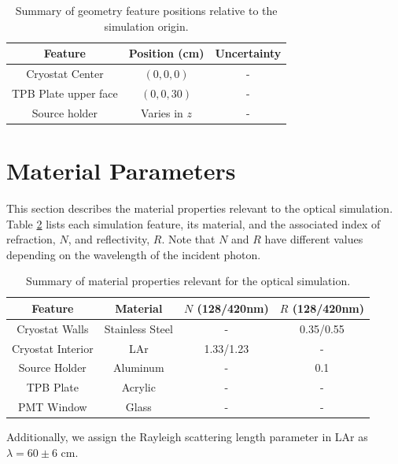 \documentclass[aps,pra,groupedaddress]{revtex4-1}
\begin{document}
\begin{table}
	\begin{center}
		\begin{tabular}{| c | c | c |}
			\hline
			Feature & Position (cm) & Uncertainty \\
			\hline
			Cryostat Center & $(0,0,0)$ & - \\
			TPB Plate upper face & $(0,0,30)$ & - \\
			Source holder & Varies in $z$ & - \\
			\hline
		\end{tabular}
		\caption{Summary of geometry feature positions relative to the simulation origin. \label{tab:pos}}
	\end{center}
\end{table}

\section{Material Parameters}

This section describes the material properties relevant to the optical simulation. Table \ref{tab:mats} lists each simulation feature, its material, and the associated index of refraction, $N$, and reflectivity, $R$. Note that $N$ and $R$ have different values depending on the wavelength of the incident photon.

\begin{table}
	\begin{center}
		\begin{tabular}{| c | c | c | c |}
			\hline
			Feature & Material & $N$ (128/420nm) & $R$ (128/420nm) \\
			\hline
			Cryostat Walls & Stainless Steel & - & 0.35/0.55 \\
			Cryostat Interior & LAr & 1.33/1.23 & -\\
			Source Holder & Aluminum & - & 0.1 \cite{johnson_1968}\\
			TPB Plate & Acrylic & - & - \\
			PMT Window & Glass & - & - \\
			\hline
		\end{tabular}
		\caption{Summary of material properties relevant for the optical simulation. \label{tab:mats}}
	\end{center}
\end{table}

Additionally, we assign the Rayleigh scattering length parameter in LAr as $\lambda=60 \pm 6$ cm.
\end{document}
